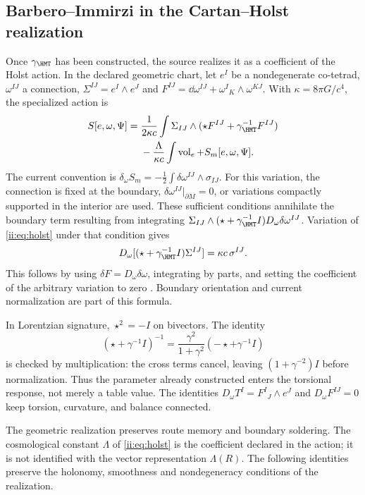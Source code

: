\subsection{Barbero--Immirzi in the Cartan--Holst realization}
Once $\gamma_{\HMT}$ has been constructed, the source realizes it as
a coefficient of the Holst action. In the declared geometric chart,
let $e^I$ be a nondegenerate co-tetrad, $\omega^{IJ}$ a connection,
$\Sigma^{IJ}=e^I\wedge e^J$ and
$F^{IJ}=\dd\omega^{IJ}+\omega^I{}_K\wedge\omega^{KJ}$.
With $\kappa=8\pi G/c^4$, the specialized action is
\begin{equation}
\begin{aligned}
S[e,\omega,\Psi]
={}&\frac1{2\kappa c}\int
\Sigma_{IJ}\wedge(\star F^{IJ}+\gamma_{\HMT}^{-1}F^{IJ})\\
&-\frac{\Lambda}{\kappa c}\int\operatorname{vol}_e
+S_m[e,\omega,\Psi].
\end{aligned}
\label{ii:eq:holst}
\end{equation}
The current convention is
$\delta_\omega S_m=-\tfrac12\int\delta\omega^{IJ}\wedge\sigma_{IJ}$.
For this variation, the connection is fixed at the boundary,
$\delta\omega^{IJ}|_{\partial M}=0$, or variations compactly
supported in the interior are used. These sufficient conditions annihilate
the boundary term resulting from integrating
$\Sigma_{IJ}\wedge(\star+\gamma_{\HMT}^{-1}I)
D_\omega\delta\omega^{IJ}$.
Variation of \eqref{ii:eq:holst} under that condition gives
\[
D_\omega[(\star+\gamma_{\HMT}^{-1}I)\Sigma^{IJ}]
=\kappa c\,\sigma^{IJ}.
\]
This follows by using $\delta F=D_\omega\delta\omega$, integrating by parts,
and setting the coefficient of the arbitrary variation to zero
\cite{ii:holst1996}. Boundary orientation and current
normalization are part of this formula.

In Lorentzian signature, $\star^2=-I$ on bivectors. The identity
\[
(\star+\gamma^{-1}I)^{-1}
=\frac{\gamma^2}{1+\gamma^2}(-\star+\gamma^{-1}I)
\]
is checked by multiplication: the cross terms
cancel, leaving $(1+\gamma^{-2})I$ before normalization.
Thus the parameter already constructed enters the torsional response,
not merely a table value.
The identities
$D_\omega T^I=F^I{}_J\wedge e^J$ and $D_\omega F^{IJ}=0$
keep torsion, curvature, and balance connected.

The geometric realization preserves route memory and boundary
soldering. The cosmological constant \(\Lambda\) of
\eqref{ii:eq:holst} is the coefficient declared in the action; it is not
identified with the vector representation \(\Lambda(R)\).
The following identities preserve the holonomy,
smoothness and nondegeneracy conditions of the realization.

